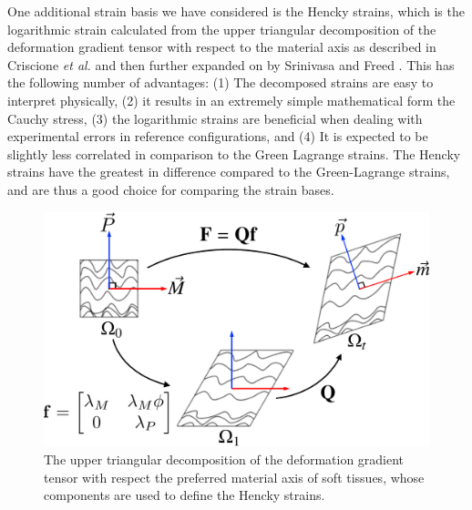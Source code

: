     One additional strain basis we have considered is the Hencky strains, which is the logarithmic strain calculated from the upper triangular decomposition of the deformation gradient tensor with respect to the material axis as described in Criscione \textit{et al.} \cite{criscione_experimentally_2003a} and then further expanded on by Srinivasa \cite{srinivasa_use_2012} and Freed \cite{freed_logarithmic_2015, freed_conjugate_2017, erel_stress/strain_2017}. This has the following number of advantages: (1) The decomposed strains are easy to interpret physically, (2) it results in an extremely simple mathematical form the Cauchy stress, (3) the logarithmic strains are beneficial when dealing with experimental errors in reference configurations, and (4) It is expected to be slightly less correlated in comparison to the Green Lagrange strains. The Hencky strains have the greatest in difference compared to the Green-Lagrange strains, and are thus a good choice for comparing the strain bases.
    
    
\begin{figure}
\centering
\includegraphics[width=5in]{Images/chapter5/henckykinematics}
\caption{The upper triangular decomposition of the deformation gradient tensor with respect the preferred material axis of soft tissues, whose components are used to define the Hencky strains.}
\label{fig:henckykinematics}
\end{figure}
    
